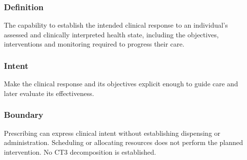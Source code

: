 \subsubsection*{Definition}

The capability to establish the intended clinical response to an individual's assessed and clinically interpreted health state, including the objectives, interventions and monitoring required to progress their care.

\subsubsection*{Intent}

Make the clinical response and its objectives explicit enough to guide care and later evaluate its effectiveness.

\subsubsection*{Boundary}

Prescribing can express clinical intent without establishing dispensing or administration. Scheduling or allocating resources does not perform the planned intervention. No CT3 decomposition is established.

